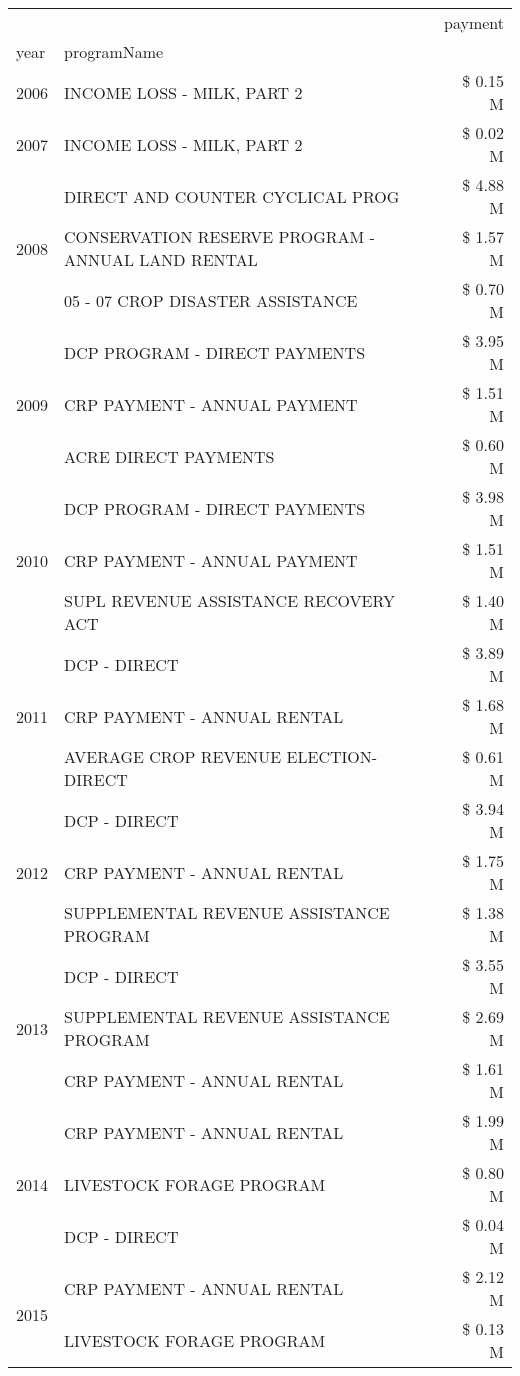\begin{tabular}{llr}
\toprule
 &  & payment \\
year & programName &  \\
\midrule
2006 & INCOME LOSS - MILK, PART 2 & \$ 0.15 M \\
\cline{1-3}
2007 & INCOME LOSS - MILK, PART 2 & \$ 0.02 M \\
\cline{1-3}
\multirow[t]{3}{*}{2008} & DIRECT AND COUNTER CYCLICAL PROG & \$ 4.88 M \\
 & CONSERVATION RESERVE PROGRAM - ANNUAL LAND RENTAL & \$ 1.57 M \\
 & 05 - 07 CROP DISASTER ASSISTANCE & \$ 0.70 M \\
\cline{1-3}
\multirow[t]{3}{*}{2009} & DCP PROGRAM - DIRECT PAYMENTS & \$ 3.95 M \\
 & CRP PAYMENT - ANNUAL PAYMENT & \$ 1.51 M \\
 & ACRE DIRECT PAYMENTS & \$ 0.60 M \\
\cline{1-3}
\multirow[t]{3}{*}{2010} & DCP PROGRAM - DIRECT PAYMENTS & \$ 3.98 M \\
 & CRP PAYMENT - ANNUAL PAYMENT & \$ 1.51 M \\
 & SUPL REVENUE ASSISTANCE RECOVERY ACT & \$ 1.40 M \\
\cline{1-3}
\multirow[t]{3}{*}{2011} & DCP - DIRECT & \$ 3.89 M \\
 & CRP PAYMENT - ANNUAL RENTAL & \$ 1.68 M \\
 & AVERAGE CROP REVENUE ELECTION-DIRECT & \$ 0.61 M \\
\cline{1-3}
\multirow[t]{3}{*}{2012} & DCP - DIRECT & \$ 3.94 M \\
 & CRP PAYMENT - ANNUAL RENTAL & \$ 1.75 M \\
 & SUPPLEMENTAL REVENUE ASSISTANCE PROGRAM & \$ 1.38 M \\
\cline{1-3}
\multirow[t]{3}{*}{2013} & DCP - DIRECT & \$ 3.55 M \\
 & SUPPLEMENTAL REVENUE ASSISTANCE PROGRAM & \$ 2.69 M \\
 & CRP PAYMENT - ANNUAL RENTAL & \$ 1.61 M \\
\cline{1-3}
\multirow[t]{3}{*}{2014} & CRP PAYMENT - ANNUAL RENTAL & \$ 1.99 M \\
 & LIVESTOCK FORAGE PROGRAM & \$ 0.80 M \\
 & DCP - DIRECT & \$ 0.04 M \\
\cline{1-3}
\multirow[t]{3}{*}{2015} & CRP PAYMENT - ANNUAL RENTAL & \$ 2.12 M \\
 & LIVESTOCK FORAGE PROGRAM & \$ 0.13 M \\

\end{tabular}
